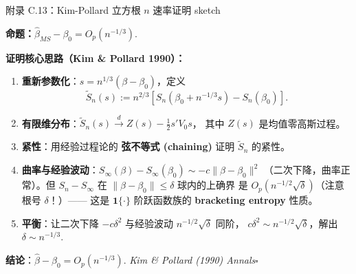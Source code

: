 \documentclass[aspectratio=169, 10pt]{beamer}
\begin{document}
\begin{frame}{附录 C.13：Kim-Pollard 立方根 $n$ 速率证明 sketch}
  \hypertarget{proof-c13}{}

  \textbf{命题：}$\hat\beta_{MS} - \beta_0 = O_p(n^{-1/3})$.

  \textbf{证明核心思路（Kim \& Pollard 1990）：}
  \begin{enumerate}\setlength{\itemsep}{1pt}
    \item \textbf{重新参数化}：$s = n^{1/3}(\beta - \beta_0)$，定义
    $$\tilde S_n(s) := n^{2/3}[S_n(\beta_0 + n^{-1/3} s) - S_n(\beta_0)].$$

    \item \textbf{有限维分布}：$\tilde S_n(s) \overset{d}{\to} Z(s) - \tfrac{1}{2} s' V_0 s$，
    其中 $Z(s)$ 是均值零高斯过程。

    \item \textbf{紧性}：用经验过程论的 \textbf{弦不等式 (chaining)} 证明 $\tilde S_n$ 的紧性。

    \item \textbf{曲率与经验波动}：$S_\infty(\beta) - S_\infty(\beta_0) \sim -c \|\beta - \beta_0\|^2$
    （二次下降，曲率正常）。但 $S_n - S_\infty$ 在 $\|\beta - \beta_0\| \leq \delta$ 球内的上确界
    是 $O_p(n^{-1/2}\sqrt{\delta})$（注意根号 $\delta$！）——
    这是 $\mathbf{1}\{\cdot\}$ 阶跃函数族的 \textbf{bracketing entropy} 性质。

    \item \textbf{平衡}：让二次下降 $-c\delta^2$ 与经验波动 $n^{-1/2}\sqrt{\delta}$ 同阶，
    $c\delta^2 \sim n^{-1/2}\sqrt{\delta}$，解出 $\delta \sim n^{-1/3}$.
  \end{enumerate}

  \textbf{结论}：$\hat\beta - \beta_0 = O_p(n^{-1/3})$. {\scriptsize\textit{Kim \& Pollard (1990) Annals}}\;$\square$
  \hfill{\scriptsize\hyperlink{main-c13}{}}

\end{frame}
\end{document}

